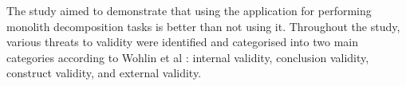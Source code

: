 The study aimed to demonstrate that using the application for performing
monolith decomposition tasks is better than not using it. Throughout the study,
various threats to validity were identified and categorised into two main
categories according to Wohlin et al \cite{wohlin2012experimentation}: internal
validity, conclusion validity, construct validity, and external validity.

